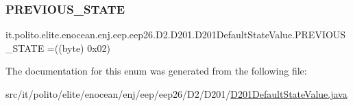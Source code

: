 \hypertarget{enumit_1_1polito_1_1elite_1_1enocean_1_1enj_1_1eep_1_1eep26_1_1_d2_1_1_d201_1_1_d201_default_state_value_abb0674012dd474bca97ab479fa0163b0}{}\label{enumit_1_1polito_1_1elite_1_1enocean_1_1enj_1_1eep_1_1eep26_1_1_d2_1_1_d201_1_1_d201_default_state_value_abb0674012dd474bca97ab479fa0163b0} 
\subsubsection{\texorpdfstring{P\+R\+E\+V\+I\+O\+U\+S\+\_\+\+S\+T\+A\+TE}{PREVIOUS\_STATE}}
{\footnotesize\ttfamily it.\+polito.\+elite.\+enocean.\+enj.\+eep.\+eep26.\+D2.\+D201.\+D201\+Default\+State\+Value.\+P\+R\+E\+V\+I\+O\+U\+S\+\_\+\+S\+T\+A\+TE =((byte) 0x02)}



The documentation for this enum was generated from the following file\+:\begin{DoxyCompactItemize}
\item 
src/it/polito/elite/enocean/enj/eep/eep26/\+D2/\+D201/\hyperlink{_d201_default_state_value_8java}{D201\+Default\+State\+Value.\+java}\end{DoxyCompactItemize}
